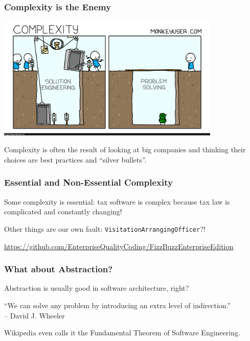 \begin{frame}
\frametitle{Complexity is the Enemy}

\begin{center}
	\includegraphics[width=0.8\textwidth]{images/complexity.png}
\end{center}

Complexity is often the result of looking at big companies and thinking their choices are best practices and ``silver bullets''.

\end{frame}

\begin{frame}
\frametitle{Essential and Non-Essential Complexity}
Some complexity is essential: tax software is complex because tax law is complicated and constantly changing!

Other things are our own fault: \texttt{VisitationArrangingOfficer}?!


\url{https://github.com/EnterpriseQualityCoding/FizzBuzzEnterpriseEdition}

\end{frame}
 
 
\begin{frame}
\frametitle{What about Abstraction?}
Abstraction is usually good in software architecture, right?

``We can solve any problem by introducing an extra level of indirection.''\\
\hfill -- David J. Wheeler

Wikipedia even calls it the Fundamental Theorem of Software Engineering.

\end{frame}

